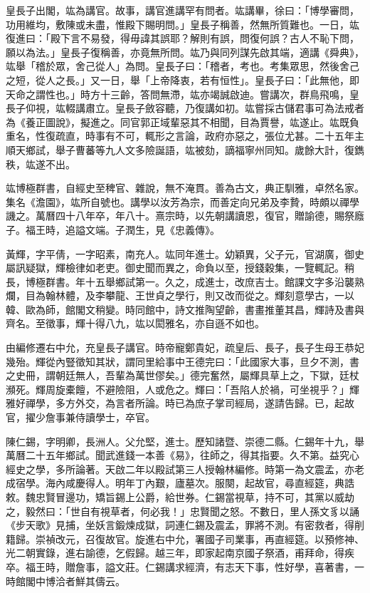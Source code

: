 \begin{pinyinscope}
皇長子出閣，竑為講官。故事，講官進講罕有問者。竑講畢，徐曰：「博學審問，功用維均，敷陳或未盡，惟殿下賜明問。」皇長子稱善，然無所質難也。一日，竑復進曰：「殿下言不易發，得毋諱其誤耶？解則有誤，問復何誤？古人不恥下問，願以為法。」皇長子復稱善，亦竟無所問。竑乃與同列謀先啟其端，適講《舜典》，竑舉「稽於眾，舍己從人」為問。皇長子曰：「稽者，考也。考集眾思，然後舍己之短，從人之長。」又一日，舉「上帝降衷，若有恒性」。皇長子曰：「此無他，即天命之謂性也。」時方十三齡，答問無滯，竑亦竭誠啟迪。嘗講次，群鳥飛鳴，皇長子仰視，竑輟講肅立。皇長子斂容聽，乃復講如初。竑嘗採古儲君事可為法戒者為《養正圖說》，擬進之。同官郭正域輩惡其不相聞，目為賈譽，竑遂止。竑既負重名，性復疏直，時事有不可，輒形之言論，政府亦惡之，張位尤甚。二十五年主順天鄉試，舉子曹蕃等九人文多險誕語，竑被劾，謫福寧州同知。歲餘大計，復鐫秩，竑遂不出。

竑博極群書，自經史至稗官、雜說，無不淹貫。善為古文，典正馴雅，卓然名家。集名《澹園》，竑所自號也。講學以汝芳為宗，而善定向兄弟及李贄，時頗以禪學譏之。萬曆四十八年卒，年八十。熹宗時，以先朝講讀恩，復官，贈諭德，賜祭廕子。福王時，追謚文端。子潤生，見《忠義傳》。

黃輝，字平倩，一字昭素，南充人。竑同年進士。幼穎異，父子元，官湖廣，御史屬訊疑獄，輝檢律如老吏。御史聞而異之，命負以至，授錢穀集，一覽輒記。稍長，博極群書。年十五舉鄉試第一。久之，成進士，改庶吉士。館課文字多沿襲熟爛，目為翰林體，及李攀龍、王世貞之學行，則又改而從之。輝刻意學古，一以韓、歐為師，館閣文稍變。時同館中，詩文推陶望齡，書畫推董其昌，輝詩及書與齊名。至徵事，輝十得八九，竑以閎雅名，亦自遜不如也。

由編修遷右中允，充皇長子講官。時帝寵鄭貴妃，疏皇后、長子，長子生母王恭妃幾殆。輝從內豎徵知其狀，謂同里給事中王德完曰：「此國家大事，旦夕不測，書之史冊，謂朝廷無人，吾輩為萬世僇矣。」德完奮然，屬輝具草上之，下獄，廷杖瀕死。輝周旋橐饘，不避險阻，人或危之。輝曰：「吾陷人於禍，可坐視乎？」輝雅好禪學，多方外交，為言者所論。時已為庶子掌司經局，遂請告歸。已，起故官，擢少詹事兼侍讀學士，卒官。

陳仁錫，字明卿，長洲人。父允堅，進士。歷知諸暨、崇德二縣。仁錫年十九，舉萬曆二十五年鄉試。聞武進錢一本善《易》，往師之，得其指要。久不第。益究心經史之學，多所論著。天啟二年以殿試第三人授翰林編修。時第一為文震孟，亦老成宿學。海內咸慶得人。明年丁內艱，廬墓次。服闋，起故官，尋直經筵，典誥敕。魏忠賢冒邊功，矯旨錫上公爵，給世券。仁錫當視草，持不可，其黨以威劫之，毅然曰：「世自有視草者，何必我！」忠賢聞之怒。不數日，里人孫文豸以誦《步天歌》見捕，坐妖言鍛煉成獄，詞連仁錫及震孟，罪將不測。有密救者，得削籍歸。崇禎改元，召復故官。旋進右中允，署國子司業事，再直經筵。以預修神、光二朝實錄，進右諭德，乞假歸。越三年，即家起南京國子祭酒，甫拜命，得疾卒。福王時，贈詹事，謚文莊。仁錫講求經濟，有志天下事，性好學，喜著書，一時館閣中博洽者鮮其儔云。


\end{pinyinscope}
